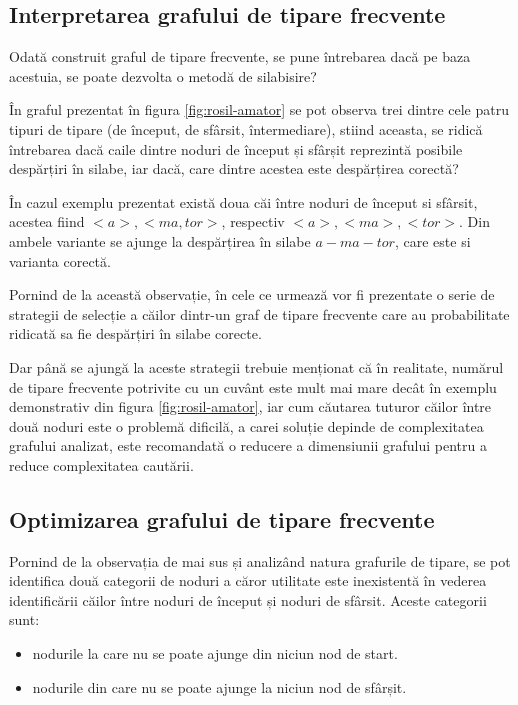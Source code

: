 \subsection{Interpretarea grafului de tipare frecvente}

Odată construit graful de tipare frecvente, se pune întrebarea dacă pe baza acestuia, se poate dezvolta o metodă de silabisire? 

În graful prezentat în figura \ref{fig:rosil-amator} se pot observa trei dintre cele patru tipuri de tipare (de început, de sfârsit, întermediare), stiind aceasta, se ridică întrebarea dacă caile dintre noduri de început și sfârșit reprezintă posibile despărțiri în silabe, iar dacă, care dintre acestea este despărțirea corectă?

În cazul exemplu prezentat există doua căi între noduri de început si sfârsit, acestea fiind $<a>, <ma, tor>$, respectiv $<a>, <ma>, <tor>$. Din ambele variante se ajunge la despărțirea în silabe $a-ma-tor$, care este si varianta corectă. 

Pornind de la această observație, în cele ce urmează vor fi prezentate o serie de strategii de selecție a căilor dintr-un graf de tipare frecvente care au probabilitate ridicată sa fie despărțiri în silabe corecte. 

Dar până se ajungă la aceste strategii trebuie menționat că în realitate, numărul de tipare frecvente potrivite cu un cuvânt este mult mai mare decât în exemplu demonstrativ din figura \ref{fig:rosil-amator}, iar cum căutarea tuturor căilor între două noduri este o problemă dificilă, a carei soluție depinde de complexitatea grafului analizat, este recomandată o reducere a dimensiunii grafului pentru a reduce complexitatea cautării. 

\subsection{Optimizarea grafului de tipare frecvente}

Pornind de la observația de mai sus și analizând natura grafurile de tipare, se pot identifica două categorii de noduri a căror utilitate este inexistentă în vederea identificării căilor între noduri de început și noduri de sfârsit. Aceste categorii sunt:
\begin{itemize}
\item nodurile la care nu se poate ajunge din niciun nod de start.
\item nodurile din care nu se poate ajunge la niciun nod de sfârșit. 
\end{itemize}


